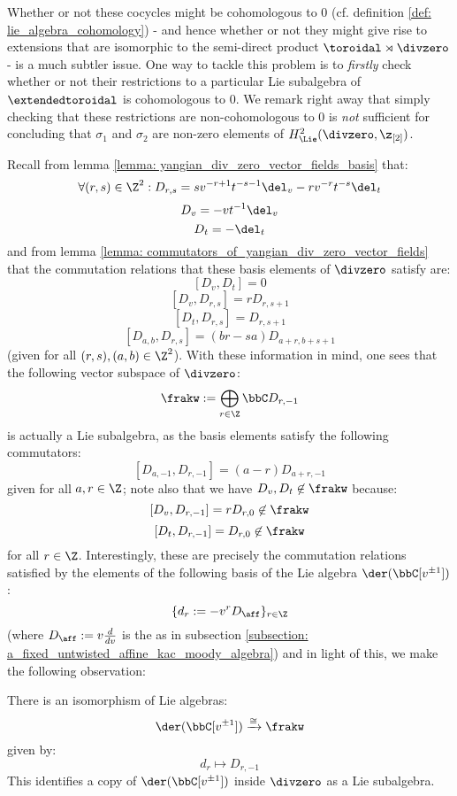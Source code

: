         Whether or not these cocycles might be cohomologous to $0$ (cf. definition \ref{def: lie_algebra_cohomology}) - and hence whether or not they might give rise to extensions that are isomorphic to the semi-direct product $\toroidal \rtimes \divzero$ - is a much subtler issue. One way to tackle this problem is to \textit{firstly} check whether or not their restrictions to a particular Lie subalgebra of $\extendedtoroidal$ is cohomologous to $0$. We remark right away that simply checking that these restrictions are non-cohomologous to $0$ is \textit{not} sufficient for concluding that $\sigma_1$ and $\sigma_2$ are non-zero elements of $H^2_{\Lie}(\divzero, \z_{[2]})$.
        
        Recall from lemma \ref{lemma: yangian_div_zero_vector_fields_basis} that:
            $$\forall (r, s) \in \Z^2: D_{r, s} = s v^{-r + 1} t^{-s - 1} \del_v - r v^{-r} t^{-s} \del_t$$
            $$D_v = -v t^{-1} \del_v$$
            $$D_t = -\del_t$$
        and from lemma \ref{lemma: commutators_of_yangian_div_zero_vector_fields} that the commutation relations that these basis elements of $\divzero$ satisfy are:
            $$[D_v, D_t] = 0$$
            $$[D_v, D_{r, s}] = r D_{r, s + 1}$$
            $$[D_t, D_{r, s}] = D_{r, s + 1}$$
            $$[D_{a, b}, D_{r, s}] = (br - sa) D_{a + r, b + s + 1}$$
        (given for all $(r, s), (a, b) \in \Z^2$). With these information in mind, one sees that the following vector subspace of $\divzero$:
            $$\frakw := \bigoplus_{r \in \Z} \bbC D_{r, -1}$$
        is actually a Lie subalgebra, as the basis elements satisfy the following commutators:
            $$[D_{a, -1}, D_{r, -1}] = (a - r) D_{a + r, -1}$$
        given for all $a, r \in \Z$; note also that we have $D_v, D_t \not \in \frakw$ because:
            $$[D_v, D_{r, -1}] = r D_{r, 0} \not \in \frakw$$
            $$[D_t, D_{r, -1}] = D_{r, 0} \not \in \frakw$$    
        for all $r \in \Z$. Interestingly, these are precisely the commutation relations satisfied by the elements of the following basis of the Lie algebra $\der(\bbC[v^{\pm 1}])$:
            $$\{ d_r := -v^r D_{\aff} \}_{r \in \Z}$$
        (where $D_{\aff} := v \frac{d}{dv}$ is the  as in subsection \ref{subsection: a_fixed_untwisted_affine_kac_moody_algebra}) and in light of this, we make the following observation:
        \begin{lemma} \label{lemma: a_copy_of_the_witt_algebra_inside_the_lie_algebra_of_yangian_div_zero_vector_fields}
            There is an isomorphism of Lie algebras:
                $$\der(\bbC[v^{\pm 1}]) \xrightarrow[]{\cong} \frakw$$
            given by:
                $$d_r \mapsto D_{r, -1}$$
            This identifies a copy of $\der(\bbC[v^{\pm 1}])$ inside $\divzero$ as a Lie subalgebra. 
        \end{lemma}

